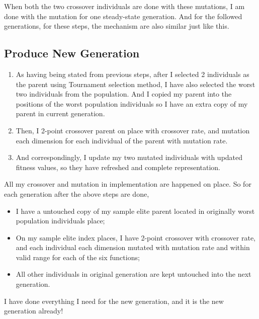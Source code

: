 \documentclass[b5paper,11pt, abstraction, titlepage]{scrartcl}
\begin{document}
\begin{CJK}{UTF8}{gbsn}
When both the two crossover individuals are done with these mutations, I am done with the mutation for one steady-state generation. And for the followed generations, for these steps, the mechanism are also similar just like this. 


\subsection{Produce New Generation}
\begin{enumerate}
  \itemsep=-3pt
\item As having being stated from previous steps, after I selected 2 individuals as the parent using Tournament selection method, I have also selected the worst two individuals from the population. And I copied my parent into the positions of the worst population individuals so I have an extra copy of my parent in current generation.
\item Then, I 2-point crossover parent on place with crossover rate, and mutation each dimension for each individual of the parent with mutation rate.
\item And correspondingly, I update my two mutated individuals with updated fitness values, so they have refreshed and complete representation.
\end{enumerate}
All my crossover and mutation in implementation are happened on place. So for each generation after the above steps are done,
\begin{itemize}
  \itemsep=-3pt
\item I have a untouched copy of my sample elite parent located in originally worst population individuals place;
\item On my sample elite index places, I have 2-point crossover with crossover rate, and each individual each dimension mutated with mutation rate and within valid range for each of the six functions;
\item All other individuals in original generation are kept untouched into the next generation.  
\end{itemize}
I have done everything I need for the new generation, and it is the new generation already!




\end{CJK}
\end{document}
